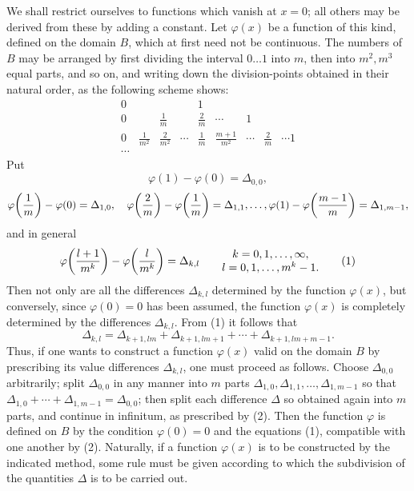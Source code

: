 \documentclass[11pt,a4paper]{article}
\begin{document}
We shall restrict ourselves to functions which vanish at $x=0$; all others may be derived from these by adding a constant. Let $\varphi(x)$ be a function of this kind, defined on the domain $B$, which at first need not be continuous. The numbers of $B$ may be arranged by first dividing the interval $0\ldots1$ into $m$, then into $m^2,m^3$ equal parts, and so on, and writing down the division-points obtained in their natural order, as the following scheme shows:
\[
\begin{array}{ccccccccc}
0&&&&1\\[2mm]
0&&\frac1m&&\frac2m&\cdots&1\\[2mm]
0&\frac1{m^2}&\frac2{m^2}&\cdots&\frac1m&\frac{m+1}{m^2}&\cdots&\frac2m&\cdots 1\\
\cdots&&&&&&&&
\end{array}
\]
Put
\[
\varphi(1)-\varphi(0)=\Delta_{0,0},
\]
\[
 \varphi\!\left({1\over m}\right)-\varphi(0)=\Delta_{1,0},\quad
 \varphi\!\left({2\over m}\right)-\varphi\!\left({1\over m}\right)=\Delta_{1,1},\ldots,
 \varphi(1)-\varphi\!\left({m-1\over m}\right)=\Delta_{1,m-1},
\]
and in general
\begin{equation}
\varphi\!\left({l+1\over m^k}\right)-\varphi\!\left({l\over m^k}\right)=\Delta_{k,l}
\qquad
\begin{matrix}
 k=0,1,\ldots,\infty,\\
 l=0,1,\ldots,m^k-1.
\end{matrix}
\tag{1}
\end{equation}
Then not only are all the differences $\Delta_{k,l}$ determined by the function $\varphi(x)$, but conversely, since $\varphi(0)=0$ has been assumed, the function $\varphi(x)$ is completely determined by the differences $\Delta_{k,l}$. From (1) it follows that
\begin{equation}
 \Delta_{k,l}=\Delta_{k+1,lm}+\Delta_{k+1,lm+1}+\cdots+\Delta_{k+1,lm+m-1}.
\tag{2}
\end{equation}
Thus, if one wants to construct a function $\varphi(x)$ valid on the domain $B$ by prescribing its value differences $\Delta_{k,l}$, one must proceed as follows. Choose $\Delta_{0,0}$ arbitrarily; split $\Delta_{0,0}$ in any manner into $m$ parts $\Delta_{1,0},\Delta_{1,1},\ldots,\Delta_{1,m-1}$ so that $\Delta_{1,0}+\cdots+\Delta_{1,m-1}=\Delta_{0,0}$; then split each difference $\Delta$ so obtained again into $m$ parts, and continue in infinitum, as prescribed by (2). Then the function $\varphi$ is defined on $B$ by the condition $\varphi(0)=0$ and the equations (1), compatible with one another by (2). Naturally, if a function $\varphi(x)$ is to be constructed by the indicated method, some rule must be given according to which the subdivision of the quantities $\Delta$ is to be carried out.
\end{document}
